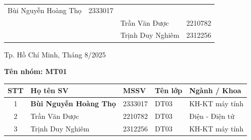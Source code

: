 \documentclass{article}
\begin{document}
\begin{titlepage}
\begin{table}[h]
\begin{tabular}{lrlc}
    Bùi Nguyễn Hoàng Thọ& 2333017\\
& & Trần Văn Được& 2210782\\
& & Trịnh Duy Nghiêm & 2312256\\

\end{tabular}
\textbf{\textit{}}\end{table}

\vspace{1.0cm}

\begin{center}
    \footnotesize Tp. Hồ Chí Minh, Tháng 8/2025
\end{center}
\end{titlepage}
\newpage
\textbf{Tên nhóm: MT01}
\begin{table}[H]
\centering
\begin{tabular}{|c|l|l|l|l|}
\hline
\textbf{STT} & \textbf{Họ tên SV} & \textbf{MSSV} & \textbf{Tên lớp} & \textbf{Ngành / Khoa} \\
\hline
1 & \textbf{Bùi Nguyễn Hoàng Thọ} & 2333017 & DT03 & KH-KT máy tính \\
\hline
2 & Trần Văn Được & 2210782 & DT03 & Điện - Điện tử \\
\hline
3 & Trịnh Duy Nghiêm & 2312256 & DT03 & KH-KT máy tính \\
\hline

\end{tabular}
\label{tab:motadonggoptungthanhvien}
\end{table}

\newpage

\tableofcontents






% 
% 
% 

\end{document}
